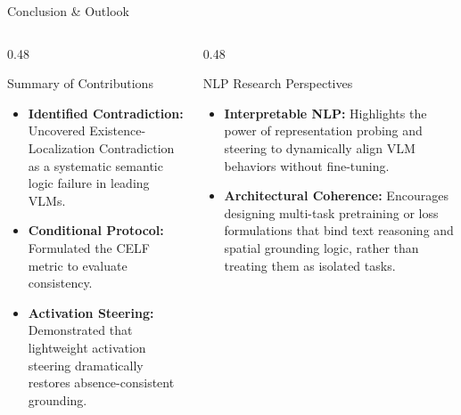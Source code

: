 \documentclass[aspectratio=169]{beamer}
\begin{document}
\begin{frame}{Conclusion \& Outlook}
    \begin{columns}[T]
        \begin{column}{0.48\textwidth}
            \begin{block}{Summary of Contributions}
                \small
                \begin{itemize}
                    \item \textbf{Identified Contradiction:} Uncovered Existence-Localization Contradiction as a systematic semantic logic failure in leading VLMs.
                    \item \textbf{Conditional Protocol:} Formulated the CELF metric to evaluate consistency.
                    \item \textbf{Activation Steering:} Demonstrated that lightweight activation steering dramatically restores absence-consistent grounding.
                \end{itemize}
            \end{block}
        \end{column}
        
        \begin{column}{0.48\textwidth}
            \begin{exampleblock}{NLP Research Perspectives}
                \small
                \begin{itemize}
                    \item \textbf{Interpretable NLP:} Highlights the power of representation probing and steering to dynamically align VLM behaviors without fine-tuning.
                    \item \textbf{Architectural Coherence:} Encourages designing multi-task pretraining or loss formulations that bind text reasoning and spatial grounding logic, rather than treating them as isolated tasks.
                \end{itemize}
            \end{exampleblock}
        \end{column}
    \end{columns}
\end{frame}
\end{document}
